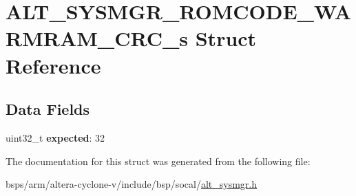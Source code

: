 \hypertarget{structALT__SYSMGR__ROMCODE__WARMRAM__CRC__s}{}\section{A\+L\+T\+\_\+\+S\+Y\+S\+M\+G\+R\+\_\+\+R\+O\+M\+C\+O\+D\+E\+\_\+\+W\+A\+R\+M\+R\+A\+M\+\_\+\+C\+R\+C\+\_\+s Struct Reference}
\label{structALT__SYSMGR__ROMCODE__WARMRAM__CRC__s}
\subsection*{Data Fields}
\begin{DoxyCompactItemize}
\item 
\mbox{\label{structALT__SYSMGR__ROMCODE__WARMRAM__CRC__s_a6e4187bd2158842c3dc50c47bf2c9812}} 
uint32\+\_\+t {\bfseries expected}\+: 32
\end{DoxyCompactItemize}


The documentation for this struct was generated from the following file\+:\begin{DoxyCompactItemize}
\item 
bsps/arm/altera-\/cyclone-\/v/include/bsp/socal/\mbox{\hyperlink{alt__sysmgr_8h}{alt\+\_\+sysmgr.\+h}}\end{DoxyCompactItemize}
